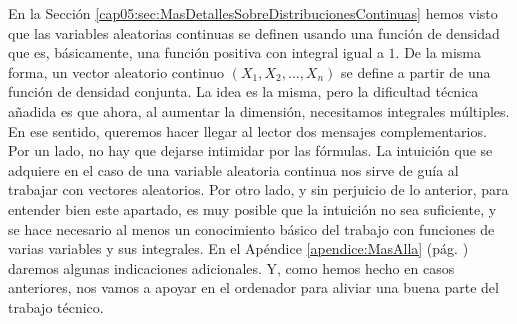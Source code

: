 En la Sección \ref{cap05:sec:MasDetallesSobreDistribucionesContinuas} hemos visto que las variables aleatorias continuas se definen usando una función de densidad que es, básicamente, una función positiva con integral igual a $1$. De la misma forma, un vector aleatorio continuo $(X_1,X_2,\ldots, X_n)$ se define a partir de una función de densidad conjunta. La idea es la misma, pero la dificultad técnica añadida es que ahora, al aumentar la dimensión, necesitamos integrales múltiples. En ese sentido, queremos hacer llegar al lector dos mensajes complementarios. Por un lado, no hay que dejarse intimidar por las fórmulas. La intuición que se adquiere en el caso de una variable aleatoria continua nos sirve de guía al trabajar con vectores aleatorios. Por otro lado, y sin perjuicio de lo anterior, para entender bien este apartado, es muy posible que la intuición no sea suficiente, y se hace necesario al menos un conocimiento básico del trabajo con funciones de varias variables y sus integrales. En el Apéndice \ref{apendice:MasAlla} (pág. \pageref{apendice:MasAlla}) daremos algunas indicaciones adicionales. Y, como hemos hecho en casos anteriores, nos vamos a apoyar en el ordenador para aliviar una buena parte del trabajo técnico.
